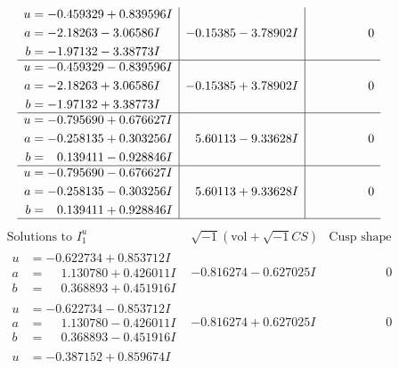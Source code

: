 \documentclass[1p]{elsarticle_modified}
\theoremstyle{definition}
\newcommand{\I}{\sqrt{-1}}
\begin{document}
$$\begin{array}{c|c|c}
\begin{aligned}
u &= -0.459329 + 0.839596 I \\
a &= -2.18263 - 3.06586 I \\
b &= -1.97132 - 3.38773 I\end{aligned}
 & -0.15385 - 3.78902 I & \phantom{-0.000000 } 0 \\ \hline\begin{aligned}
u &= -0.459329 - 0.839596 I \\
a &= -2.18263 + 3.06586 I \\
b &= -1.97132 + 3.38773 I\end{aligned}
 & -0.15385 + 3.78902 I & \phantom{-0.000000 } 0 \\ \hline\begin{aligned}
u &= -0.795690 + 0.676627 I \\
a &= -0.258135 + 0.303256 I \\
b &= \phantom{-}0.139411 - 0.928846 I\end{aligned}
 & \phantom{-}5.60113 - 9.33628 I & \phantom{-0.000000 } 0 \\ \hline\begin{aligned}
u &= -0.795690 - 0.676627 I \\
a &= -0.258135 - 0.303256 I \\
b &= \phantom{-}0.139411 + 0.928846 I\end{aligned}
 & \phantom{-}5.60113 + 9.33628 I & \phantom{-0.000000 } 0\\
 \hline 
 \end{array}$$\newpage$$\begin{array}{c|c|c}  
\text{Solutions to }I^u_{1}& \I (\text{vol} + \sqrt{-1}CS) & \text{Cusp shape}\\
 \hline 
\begin{aligned}
u &= -0.622734 + 0.853712 I \\
a &= \phantom{-}1.130780 + 0.426011 I \\
b &= \phantom{-}0.368893 + 0.451916 I\end{aligned}
 & -0.816274 - 0.627025 I & \phantom{-0.000000 } 0 \\ \hline\begin{aligned}
u &= -0.622734 - 0.853712 I \\
a &= \phantom{-}1.130780 - 0.426011 I \\
b &= \phantom{-}0.368893 - 0.451916 I\end{aligned}
 & -0.816274 + 0.627025 I & \phantom{-0.000000 } 0 \\ \hline\begin{aligned}
u &= -0.387152 + 0.859674 I \\

\end{aligned}
\end{array}$$
\end{document}
